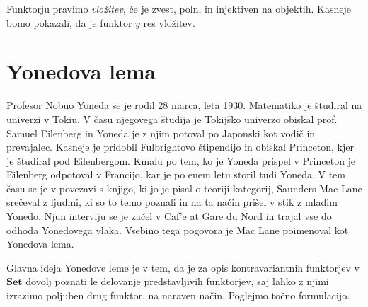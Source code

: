 \documentclass[12pt,a4paper]{book}
\theoremstyle{definition}
\theoremstyle{plain}
\theoremstyle{definition}
\theoremstyle{remark}
\newcommand{\cat}[1]{\textbf{#1}}
\begin{document}
Funktorju pravimo \emph{vložitev}, če je zvest, poln, in injektiven na objektih. Kasneje bomo pokazali, da je funktor $y$ res vložitev. 

\section{Yonedova lema}

Profesor Nobuo Yoneda se je rodil 28 marca, leta 1930. Matematiko je študiral na univerzi v Tokiu. V času njegovega študija je Tokijško univerzo obiskal prof. Samuel Eilenberg in Yoneda je z njim potoval po Japonski kot vodič in prevajalec. Kasneje je pridobil Fulbrightovo štipendijo in obiskal Princeton, kjer je študiral pod Eilenbergom. Kmalu po tem, ko je Yoneda prispel v Princeton je Eilenberg odpotoval v Francijo, kar je po enem letu storil tudi Yoneda. V tem času se je v povezavi s knjigo, ki jo je pisal o teoriji kategorij, Saunders Mac Lane srečeval z ljudmi, ki so to temo poznali in na ta način prišel v stik z mladim Yonedo. Njun interviju se je začel v Caf'e at Gare du Nord in trajal vse do odhoda Yonedovega vlaka. Vsebino tega pogovora je Mac Lane poimenoval kot Yonedova lema. \cite{history}


Glavna ideja Yonedove leme je v tem, da je za opis kontravariantnih funktorjev v $\cat{Set}$ dovolj poznati le delovanje predstavljivih funktorjev, saj lahko z njimi izrazimo poljuben drug funktor, na naraven način. Poglejmo točno formulacijo.
\end{document}
